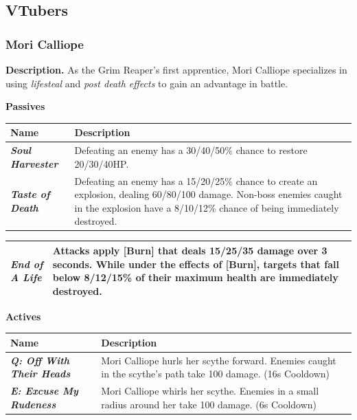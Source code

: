 \documentclass[10pt, a4paper]{article}
\begin{document}
\begin{multicols}{2}
	\subsection{VTubers} \label{VTubers}
  	
  	\subsubsection{Mori Calliope}
  	
  	\textbf{Description.} As the Grim Reaper's first apprentice, Mori Calliope specializes in using \textit{lifesteal} and \textit{post death effects} to gain an advantage in battle.

	\textbf{Passives}
	
	\begin{center}
		\begin{tabular}{|p{2.7cm}|p{5.5cm}|}
			\hline
			\textbf{Name} & \textbf{Description} \\
			\hline
			\textit{\textbf{Soul Harvester}} & Defeating an enemy has a 30/40/50\% chance to restore 20/30/40HP. \\
			\textit{\textbf{Taste of Death}} & Defeating an enemy has a 15/20/25\% chance to create an explosion, dealing 60/80/100 damage. Non-boss enemies caught in the explosion have a 8/10/12\% chance of being immediately destroyed. \\
		
		\end{tabular}
	\end{center}
	
	\begin{center}
		\begin{tabular}{|p{2.7cm}|p{5.5cm}|}
				\textit{\textbf{End of A Life}}  & Attacks apply [Burn] that deals 15/25/35 damage over 3 seconds. While under the effects of [Burn], targets that fall below 8/12/15\% of their maximum health are immediately destroyed. \\
			\hline
			
		\end{tabular}
	\end{center}
	
	\begin{center}
		\textbf{Actives}
	\end{center}
	
	\begin{center}
		\begin{tabular}{|p{2.7cm}|p{5.5cm}|}
			\hline
			\textbf{Name} & \textbf{Description} \\
			\hline
			\textit{\textbf{Q: Off With Their Heads}} & Mori Calliope hurls her scythe forward. Enemies caught in the scythe's path take 100 damage. (16s Cooldown)\\
			\textit{\textbf{E: Excuse My Rudeness}} & Mori Calliope whirls her scythe. Enemies in a small radius around her take 100 damage. (6s Cooldown) \\
			\hline
		\end{tabular}
	\end{center}


\end{multicols}
\end{document}
